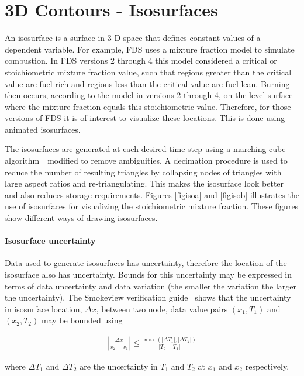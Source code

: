 \documentclass[11pt,twoside]{book}
\begin{document}
%
%

\clearpage
\section{3D Contours - Isosurfaces}
An isosurface is a surface in 3-D space that defines constant
values of a dependent variable. For example, FDS uses a mixture
fraction model to simulate combustion. In FDS versions 2 through 4
this model considered a critical or stoichiometric mixture fraction
value, such that regions greater than the critical value are fuel
rich and regions less than the critical value are fuel lean.
Burning then occurs, according to the model in versions 2 through
4, on the level surface where the mixture fraction equals this
stoichiometric value. Therefore, for those versions of FDS it is of
interest to visualize these locations. This is done using animated
isosurfaces.

The isosurfaces are generated at each desired time step using a
marching cube algorithm~\cite{marchingcubes}\ modified to remove
ambiguities. A decimation procedure is used to reduce the number
of resulting triangles by collapsing nodes of triangles with large
aspect ratios and re-triangulating. This makes the isosurface look
better and also reduces storage requirements. Figures
\ref{figisoa} and \ref{figisob} illustrates the use of isosurfaces
for visualizing the stoichiometric mixture fraction. These figures
show different ways of drawing isosurfaces.

\paragraph{Isosurface uncertainty} Data used to generate isosurfaces has uncertainty, therefore the location of the isosurface
also has uncertainty.  Bounds for this uncertainty may be expressed in terms of data uncertainty and data variation (the smaller the variation the larger the uncertainty).
The Smokeview verification guide~\cite{Smokeview_Verification_Guide} shows that the uncertainty in isosurface location, $\Delta x$, between two node, data value pairs $(x_1,T_1)$ and $(x_2,T_2)$  may be bounded using

\begin{eqnarray}
\left|\frac{\Delta x}{x_2-x_1}\right|\le
\frac{\max(|\Delta T_1|,|\Delta T_2|)}{|T_2-T_1|}
\end{eqnarray}

\noindent where $\Delta T_1$ and $\Delta T_2$ are the uncertainty in $T_1$ and $T_2$ at $x_1$ and $x_2$ respectively.
\end{document}
